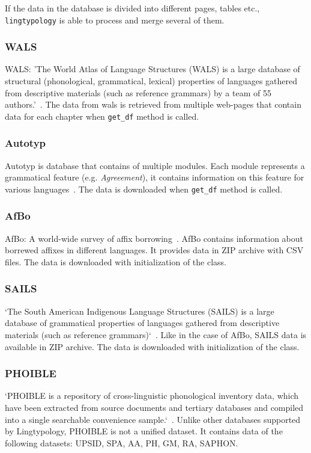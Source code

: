 \documentclass[a4paper,12pt]{article}
\begin{document}
If the data in the database is divided into different pages, tables etc., \texttt{lingtypology} is able to process and merge several of them.

\subsubsection{WALS}
WALS: 'The World Atlas of Language Structures (WALS) is a large database of structural (phonological, grammatical, lexical) properties of languages gathered from descriptive materials (such as reference grammars) by a team of 55 authors.'~\parencite{wals}. The data from wals is retrieved from multiple web-pages that contain data for each chapter when \texttt{get\_df} method is called.

\subsubsection{Autotyp}
Autotyp is database that contains of multiple modules. Each module represents a grammatical feature (e.g. \textit{Agreeement}), it contains information on this feature for various languages~\parencite{autotyp}. The data is downloaded when \texttt{get\_df} method is called.

\subsubsection{AfBo}
AfBo: A world-wide survey of affix borrowing~\parencite{afbo}. AfBo contains information about borrewed affixes in different languages. It provides data in ZIP archive with CSV files. The data is downloaded with initialization of the class.

\subsubsection{SAILS}
`The South American Indigenous Language Structures (SAILS) is a large
database of grammatical properties of languages gathered from descriptive materials (such as reference grammars)`~\parencite{sails}. Like in the case of AfBo, SAILS data is available in ZIP archive. The data is downloaded with initialization of the class.

\subsubsection{PHOIBLE}
`PHOIBLE is a repository of cross-linguistic phonological inventory data, which have been extracted from source documents and tertiary databases and compiled into a single searchable convenience sample.`~\parencite{phoible}.
Unlike other databases supported by Lingtypology, PHOIBLE is not a unified dataset. It contains data of the following datasets: UPSID, SPA, AA, PH, GM, RA, SAPHON.
\end{document}
